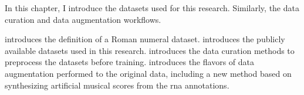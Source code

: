 
In this chapter, I introduce the datasets used for this
research. Similarly, the data curation and data augmentation
workflows.

 introduces the
definition of a Roman numeral dataset.
 introduces the publicly available
datasets used in this research. 
introduces the data curation methods to preprocess the
datasets before training. 
introduces the flavors of data augmentation performed to the
original data, including a new method based on synthesizing
artificial musical scores from the \gls{rna} annotations.
